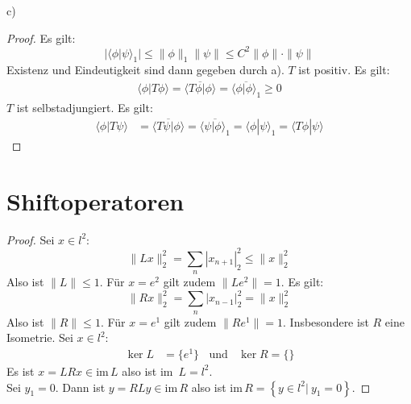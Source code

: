 \documentclass[a4paper,12pt]{article}
\newcommand{\brak}{}
\newcommand{\klammer}{}
\begin{document}
c)
\begin{proof}
Es gilt:
$$|\brak\langle {\phi}| {\psi}\rangle_1|\le\|\phi\|_1\|\psi\|\le C^2\|\phi\|\cdot\|\psi\|$$
Existenz und Eindeutigkeit sind dann gegeben durch a).
$T$ ist positiv. Es gilt:
\begin{align*}
\brak\langle {\phi}| {T\phi}\rangle=\overline{\brak\langle {T\phi}| {\phi}\rangle}=\overline{\brak\langle {\phi}| {\phi}\rangle_1}\ge 0
\end{align*}
$T$ ist selbstadjungiert. Es gilt:
\begin{align*}
\brak\langle {\phi}| {T\psi}\rangle&=\overline{\brak\langle {T\psi}| {\phi}\rangle}=\overline{\brak\langle {\psi}| {\phi}\rangle_1}=\brak\langle {\phi}| {\psi}\rangle_1=\brak\langle {T\phi}| {\psi}\rangle
\end{align*}
\end{proof}
\section{Shiftoperatoren}
\begin{proof}
Sei $x\in l^2$:
$$\|Lx\|_2^2=\sum_n|x_{n+1}|_2^2\le \|x\|_2^2$$
Also ist $\|L\|\le 1$. Für $x=e^2$ gilt zudem $\|Le^2\|=1$.
Es gilt:
$$\|Rx\|_2^2=\sum_n|x_{n-1}|_2^2= \|x\|_2^2$$
Also ist $\|R\|\le 1$. Für $x=e^1$ gilt zudem $\|Re^1\|=1$. Insbesondere ist $R$ eine Isometrie.
Sei $x\in l^2$:
\begin{align*}
\ker L&=\{e^1\}\ \ \ \ \mathrm{und}\ \ \ \ \ker R=\{\}
\end{align*}
Es ist $x=LRx\in\mathrm{im\,}L$ also ist im\, $L=l^2$.\\
Sei $y_1=0$. Dann ist $y=RLy\in\mathrm{im\,}R$ also ist im\,$R=\klammer\left\{ {y\in l^2|\ y_1=0} \right\}$. 
\end{proof}
\end{document}
